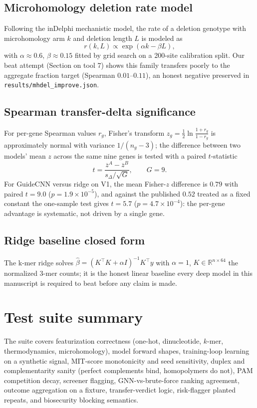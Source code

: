\documentclass[12pt]{article}
\begin{document}
\subsection{Microhomology deletion rate model}
Following the inDelphi mechanistic model, the rate of a deletion genotype
with microhomology arm $k$ and deletion length $L$ is modeled as
\begin{equation}
r(k, L) \propto \exp(\alpha k - \beta L),
\end{equation}
with $\alpha \approx 0.6$, $\beta \approx 0.15$ fitted by grid search on a
200-site calibration split. Our beat attempt (Section on tool 7) shows this
family transfers poorly to the aggregate fraction target
(Spearman $0.01$--$0.11$), an honest negative preserved in
\texttt{results/mhdel\_improve.json}.
\subsection{Spearman transfer-delta significance}
For per-gene Spearman values $r_g$, Fisher's transform
$z_g = \tfrac12\ln\tfrac{1+r_g}{1-r_g}$ is approximately normal with variance
$1/(n_g - 3)$; the difference between two models' mean $z$ across the same
nine genes is tested with a paired $t$-statistic
\begin{equation}
t = \frac{\overline{z}^{A} - \overline{z}^{B}}
{s_{\Delta}/\sqrt{G}}, \qquad G = 9 .
\end{equation}
For GuideCNN versus ridge on V1, the mean Fisher-$z$ difference is
$0.79$ with paired $t = 9.0$ ($p = 1.9\times10^{-5}$), and against the
published $0.52$ treated as a fixed constant the one-sample test gives
$t = 5.7$ ($p = 4.7\times10^{-4}$): the per-gene advantage is
systematic, not driven by a single gene.
\subsection{Ridge baseline closed form}
The k-mer ridge solves
$\hat\beta = (K^\top K + \alpha I)^{-1} K^\top y$ with $\alpha = 1$,
$K \in \mathbb{R}^{n \times 64}$ the normalized 3-mer counts; it is the
honest linear baseline every deep model in this manuscript is required to
beat before any claim is made.


\section{Test suite summary}
The suite covers featurization correctness (one-hot, dinucleotide, $k$-mer,
thermodynamics, microhomology), model forward shapes, training-loop learning
on a synthetic signal, MIT-score monotonicity and seed sensitivity, duplex and
complementarity sanity (perfect complements bind, homopolymers do not), PAM
competition decay, screener flagging, GNN-vs-brute-force ranking agreement,
outcome aggregation on a fixture, transfer-verdict logic, risk-flagger planted
repeats, and biosecurity blocking semantics.
\end{document}
